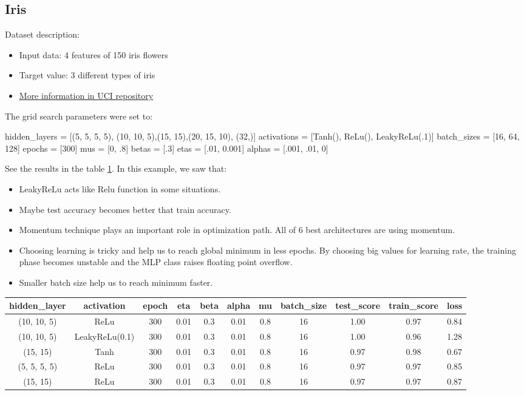 \documentclass[10pt]{SelfArx} %
\begin{document}
	\subsection{Iris}
	Dataset description:
	\begin{itemize}
		\item Input data: 4 features of 150 iris flowers
		
		\item Target value: 3 different types of iris	
		
		\item \href{https://archive.ics.uci.edu/ml/datasets/Iris}{More information in UCI repository}
	\end{itemize}
	The grid search parameters were set to:
	\begin{python}
hidden_layers = [(5, 5, 5, 5),
(10, 10, 5),(15, 15),(20, 15, 10),
(32,)]
activations = [Tanh(), ReLu(),
LeakyReLu(.1)]
batch_sizes = [16, 64, 128]
epochs = [300]
mus = [0, .8]
betas = [.3]
etas = [.01, 0.001]
alphas = [.001, .01, 0]
	\end{python}
	See the results in the table \ref{tiris}. In this example, we saw that:
	\begin{itemize}
		\item  LeakyReLu acts like Relu function in some situations.
		\item  Maybe test accuracy becomes better that train accuracy.
		\item  Momentum technique plays an important role in optimization path. All of 6 best architectures are using momentum.
		\item  Choosing learning is tricky and help us to reach global minimum in less epochs. By choosing big values for learning rate, the training phase becomes unstable and the MLP class raises floating point overflow.
		\item  Smaller batch size help us to reach minimum faster.
	\end{itemize}
	\begin{table}[hbt]
		\centering
		\begin{tabular*}{1\textwidth}{@{\extracolsep{\fill} }ccccccccccc@{}}
			\toprule
			hidden\_layer & activation & epoch & eta & beta & alpha & mu & batch\_size & test\_score & train\_score & loss \\ \midrule
			(10, 10, 5) & ReLu & 300 & 0.01 & 0.3 & 0.01 & 0.8 & 16 & 1.00 & 0.97 & 0.84 \\
			(10, 10, 5) & LeakyReLu(0.1) & 300 & 0.01 & 0.3 & 0.01 & 0.8 & 16 & 1.00 & 0.96 & 1.28 \\
			(15, 15) & Tanh & 300 & 0.01 & 0.3 & 0.01 & 0.8 & 16 & 0.97 & 0.98 & 0.67 \\
			(5, 5, 5, 5) & ReLu & 300 & 0.01 & 0.3 & 0.01 & 0.8 & 16 & 0.97 & 0.97 & 0.85 \\
			(15, 15) & ReLu & 300 & 0.01 & 0.3 & 0.01 & 0.8 & 16 & 0.97 & 0.97 & 0.87 \\ \bottomrule
		\end{tabular*}
		\label{tiris}
	\end{table}
\end{document}
